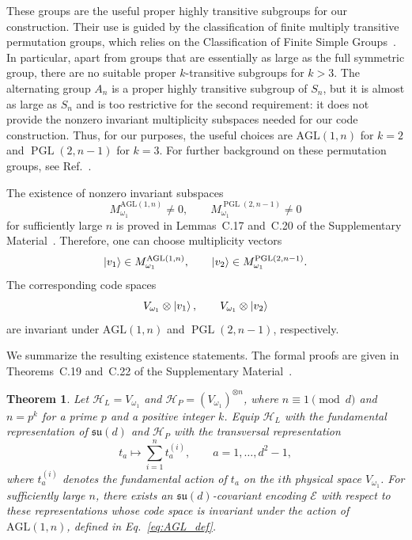 \documentclass[10pt,twocolumn,superscriptaddress,aps,amsmath,amssymb,citeautoscript,floatfix,prx]{revtex4-2}
\newtheorem{theorem}{Theorem}
\theoremstyle{plain}
\theoremstyle{plain}
\theoremstyle{plain}
\theoremstyle{plain}
\theoremstyle{plain}
\theoremstyle{plain}
\begin{document}
These groups are the useful proper highly transitive subgroups for our construction. Their use is guided by the classification of finite multiply transitive permutation groups, which relies on the Classification of Finite Simple Groups~\cite{GorensteinLyonsSolomon1994}. In particular, apart from groups that are essentially as large as the full symmetric group, there are no suitable proper $k$-transitive subgroups for $k>3$. The alternating group $A_n$ is a proper highly transitive subgroup of $S_n$, but it is almost as large as $S_n$ and is too restrictive for the second requirement: it does not provide the nonzero invariant multiplicity subspaces needed for our code construction. Thus, for our purposes, the useful choices are $\mathrm{AGL}(1,n)$ for $k=2$ and $\operatorname{PGL}(2,n-1)$ for $k=3$. For further background on these permutation groups, see Ref.~\cite{DixonMortimer1996}.

The existence of nonzero invariant subspaces
$$
M_{\omega_1}^{\mathrm{AGL}(1,n)}
\neq
0,
\qquad
M_{\omega_1}^{\operatorname{PGL}(2,n-1)}
\neq
0
$$
for sufficiently large $n$ is proved in Lemmas~C.17 and~C.20 of the Supplementary Material~\cite{SuppMat}. Therefore, one can choose multiplicity vectors
$$
\ket{v_1}\in M_{\omega_1}^{\mathrm{AGL}(1,n)},
\qquad
\ket{v_2}\in M_{\omega_1}^{\operatorname{PGL}(2,n-1)}.
$$
The corresponding code spaces
$$
V_{\omega_1}\otimes\ket{v_1},
\qquad
V_{\omega_1}\otimes\ket{v_2}
$$
are invariant under $\mathrm{AGL}(1,n)$ and $\operatorname{PGL}(2,n-1)$, respectively.

We summarize the resulting existence statements. The formal proofs are given in Theorems~C.19 and~C.22 of the Supplementary Material~\cite{SuppMat}.

\begin{theorem}\label{thrm:main_2_transitive_covariant_code}
Let $\mathcal H_L=V_{\omega_1}$ and $\mathcal H_P=(V_{\omega_1})^{\otimes n}$, where $n\equiv 1\pmod d$ and $n=p^k$ for a prime $p$ and a positive integer $k$. Equip $\mathcal H_L$ with the fundamental representation of $\mathfrak{su}(d)$ and $\mathcal H_P$ with the transversal representation
$$
t_a
\longmapsto
\sum_{i=1}^n t_a^{(i)},
\qquad
a=1,\ldots,d^2-1,
$$
where $t_a^{(i)}$ denotes the fundamental action of $t_a$ on the $i$th physical space $V_{\omega_1}$. For sufficiently large $n$, there exists an $\mathfrak{su}(d)$-covariant encoding $\mathcal E$ with respect to these representations whose code space is invariant under the action of $\mathrm{AGL}(1,n)$, defined in Eq.~\eqref{eq:AGL_def}.
\end{theorem}
\end{document}
